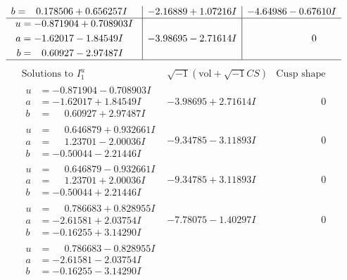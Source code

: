 \documentclass[1p]{elsarticle_modified}
\theoremstyle{definition}
\newcommand{\I}{\sqrt{-1}}
\begin{document}
$$\begin{array}{c|c|c}
\begin{aligned}
b &= \phantom{-}0.178506 + 0.656257 I\end{aligned}
 & -2.16889 + 1.07216 I & -4.64986 - 0.67610 I \\ \hline\begin{aligned}
u &= -0.871904 + 0.708903 I \\
a &= -1.62017 - 1.84549 I \\
b &= \phantom{-}0.60927 - 2.97487 I\end{aligned}
 & -3.98695 - 2.71614 I & \phantom{-0.000000 } 0\\
 \hline 
 \end{array}$$\newpage$$\begin{array}{c|c|c}  
\text{Solutions to }I^u_{1}& \I (\text{vol} + \sqrt{-1}CS) & \text{Cusp shape}\\
 \hline 
\begin{aligned}
u &= -0.871904 - 0.708903 I \\
a &= -1.62017 + 1.84549 I \\
b &= \phantom{-}0.60927 + 2.97487 I\end{aligned}
 & -3.98695 + 2.71614 I & \phantom{-0.000000 } 0 \\ \hline\begin{aligned}
u &= \phantom{-}0.646879 + 0.932661 I \\
a &= \phantom{-}1.23701 - 2.00036 I \\
b &= -0.50044 - 2.21446 I\end{aligned}
 & -9.34785 - 3.11893 I & \phantom{-0.000000 } 0 \\ \hline\begin{aligned}
u &= \phantom{-}0.646879 - 0.932661 I \\
a &= \phantom{-}1.23701 + 2.00036 I \\
b &= -0.50044 + 2.21446 I\end{aligned}
 & -9.34785 + 3.11893 I & \phantom{-0.000000 } 0 \\ \hline\begin{aligned}
u &= \phantom{-}0.786683 + 0.828955 I \\
a &= -2.61581 + 2.03754 I \\
b &= -0.16255 + 3.14290 I\end{aligned}
 & -7.78075 - 1.40297 I & \phantom{-0.000000 } 0 \\ \hline\begin{aligned}
u &= \phantom{-}0.786683 - 0.828955 I \\
a &= -2.61581 - 2.03754 I \\
b &= -0.16255 - 3.14290 I\end{aligned}

\end{array}$$
\end{document}

